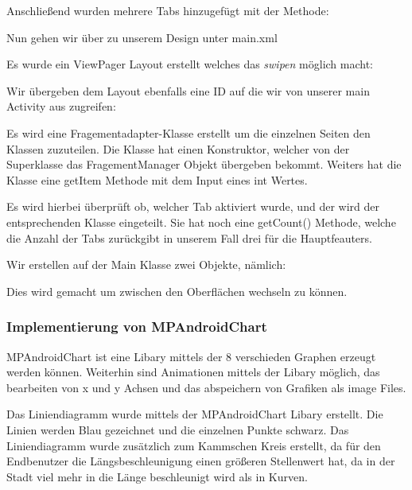 Anschließend wurden mehrere Tabs hinzugefügt mit der Methode:




Nun gehen wir über zu unserem Design unter main.xml

Es wurde ein ViewPager Layout erstellt welches das \textit{swipen} möglich macht:



Wir übergeben dem Layout ebenfalls eine ID auf die wir von unserer main Activity aus zugreifen: 




Es wird eine Fragementadapter-Klasse erstellt um die einzelnen Seiten den Klassen zuzuteilen. 
Die Klasse hat einen Konstruktor, welcher von der Superklasse das FragementManager Objekt übergeben bekommt.
Weiters hat die Klasse eine getItem Methode mit dem Input eines int Wertes. 



Es wird hierbei überprüft ob, welcher Tab aktiviert wurde, und der wird der entsprechenden Klasse eingeteilt. 
Sie hat noch eine getCount() Methode, welche die Anzahl der Tabs zurückgibt in unserem Fall drei für die Hauptfeauters.


Wir erstellen auf der Main Klasse zwei Objekte, nämlich:


Dies wird gemacht um zwischen den Oberflächen wechseln zu können.

 

\subsubsection*{Implementierung von MPAndroidChart}
MPAndroidChart ist eine Libary mittels der 8 verschieden Graphen erzeugt werden können. Weiterhin sind Animationen mittels der Libary möglich, das bearbeiten von x und y Achsen und das abspeichern von Grafiken als image Files.

Das Liniendiagramm wurde mittels der MPAndroidChart Libary erstellt. Die Linien werden Blau gezeichnet und die einzelnen Punkte schwarz. Das Liniendiagramm wurde zusätzlich zum Kammschen Kreis erstellt, da für den Endbenutzer die Längsbeschleunigung einen größeren Stellenwert hat, da in der Stadt viel mehr in die Länge beschleunigt wird als in Kurven.

